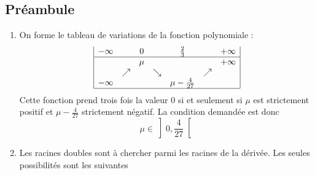 \subsection*{Préambule}
\begin{enumerate}
 \item On forme le tableau de variations de la fonction polynomiale :
\begin{displaymath}
\begin{array}{|ccccccc|}
-\infty &          & 0      &         & \frac{2}{3} &         & +\infty \\  \hline
        &          & \mu    &         &             &         & +\infty \\ 
        & \nearrow &        &\searrow &             &\nearrow &          \\
-\infty &          &        &         & \mu-\frac{4}{27}            &         &          \\ \hline
\end{array}
 \end{displaymath}
Cette fonction prend trois fois la valeur $0$ si et seulement si $\mu$ est strictement positif et $\mu -\frac{4}{27}$ strictement négatif. La condition demandée est donc
\begin{displaymath}
 \mu \in \left] 0, \dfrac{4}{27}\right[ 
\end{displaymath}
\item Les racines doubles sont à chercher parmi les racines de la dérivée. Les seules possibilités sont les suivantes
\end{enumerate}

